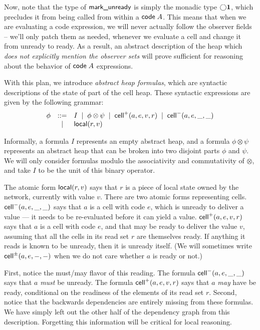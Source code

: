 \documentclass[preprint,natbib]{sigplanconf}
\begin{document}
Now, note that the type of $\mbox{\textsf{{mark\_unready}}}$ is simply the monadic
type $\bigcirc{\mathbf{1}}$, which precludes it from being called from within
a $\mbox{\textsf{{code}}}\;{A}$. This means that when we are evaluating a code
expression, we will never actually follow the observer fields --
we'll only patch them as needed, whenever we evaluate a
cell and change it from unready to ready.  As a result, an abstract
description of the heap which \emph{does not explicitly mention
the observer sets} will prove sufficient for reasoning about
the behavior of $\mbox{\textsf{{code}}}\;{A}$ expressions.

With this plan, we introduce \emph{abstract heap formulas}, which are
syntactic descriptions of the state of part of the cell heap. These
syntactic expressions are given by the following grammar:
\begin{displaymath}
  \begin{array}{lcl}
    \phi & ::= & I \;\;|\;\; \phi \otimes \psi \;\;|\;\; \mbox{\textsf{{cell}}}^{+}({a}, {e}, {v}, {r}) \;\;|\;\; \mbox{\textsf{{cell}}}^{-}({a}, {e}, {\_}, {\_})\\
         &  |  & \mbox{\textsf{{local}}}({r}, {v}) 
  \end{array}
\end{displaymath}

Informally, a formula $I$ represents an empty abstract heap, and a
formula $\phi \otimes \psi$ represents an abstract heap that can be
broken into two disjoint parts $\phi$ and $\psi$. We will only
consider formulas modulo the associativity and commutativity of
$\otimes$, and take $I$ to be the unit of this binary operator.

The atomic form $\mbox{\textsf{{local}}}({r}, {v})$ says that $r$ is a piece of local
state owned by the network, currently with value $v$. There are two
atomic forms representing cells. $\mbox{\textsf{{cell}}}^{-}({a}, {e}, {\_}, {\_})$ says that $a$ is a
cell with code $e$, which is unready to deliver a value --- it needs
to be re-evaluated before it can yield a value. $\mbox{\textsf{{cell}}}^{+}({a}, {e}, {v}, {r})$
says that $a$ is a cell with code $e$, and that may be ready to deliver
the value $v$, assuming that all the cells in its read set $r$ are themselves
ready. If anything it reads is known to be unready, then it is unready
itself. (We will sometimes write $\mbox{\textsf{{cell}}}^{\pm}({a}, {e}, {-}, {-})$ when we do not care
whether $a$ is ready or not.)

First, notice the must/may flavor of this reading. The formula
$\mbox{\textsf{{cell}}}^{-}({a}, {e}, {\_}, {\_})$ says that $a$ \emph{must} be unready.  The formula
$\mbox{\textsf{{cell}}}^{+}({a}, {e}, {v}, {r})$ says that $a$ \emph{may} have be ready,
conditional on the readiness of the elements of its read set
$r$. Second, notice that the backwards dependencies are entirely
missing from these formulas. We have simply left out the other half of
the dependency graph from this description. Forgetting this
information will be critical for local reasoning.
\end{document}
